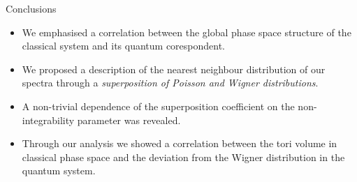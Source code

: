 \documentclass[a4,compress]{beamer}
\begin{document}
\begin{frame}{Conclusions}
  \begin{itemize}
    \item We emphasised a correlation between the global phase space
    structure of the classical system and its quantum corespondent.
    \item We proposed a description of the nearest neighbour distribution of
    our spectra through a \emph{superposition of Poisson and Wigner distributions}.
    \item A non-trivial dependence of the superposition coefficient on the
    non-integrability parameter was revealed.
    \item Through our analysis we showed a correlation between the tori volume
    in classical phase space and the deviation from the Wigner distribution
    in the quantum system.
  \end{itemize}
\end{frame}
\end{document}
